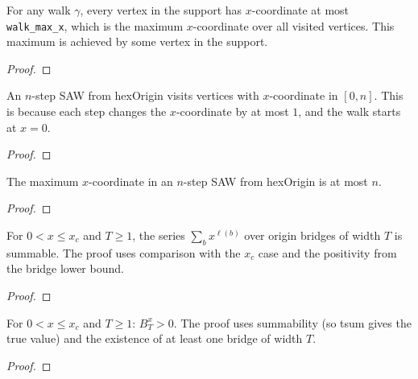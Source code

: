 \begin{theorem}\label{thm:walk_max_x}
\leanok
{}
  For any walk $\gamma$, every vertex in the support has $x$-coordinate
  at most \texttt{walk\_max\_x}, which is the maximum $x$-coordinate
  over all visited vertices. This maximum is achieved by some vertex
  in the support.
\end{theorem}
\begin{proof}
\leanok
\end{proof}

\begin{theorem}\label{thm:saw_x_bound}
\leanok
{}
  An $n$-step SAW from hexOrigin visits vertices with $x$-coordinate
  in $[0, n]$. This is because each step changes the $x$-coordinate
  by at most $1$, and the walk starts at $x = 0$.
\end{theorem}
\begin{proof}
\leanok
\end{proof}

\begin{theorem}\label{thm:saw_max_x_le}
\leanok
{}
  The maximum $x$-coordinate in an $n$-step SAW from hexOrigin is at most $n$.
\end{theorem}
\begin{proof}
\leanok
{}
\end{proof}

\begin{theorem}\label{thm:bridge_summable_le}
\leanok
{}
  For $0 < x \leq x_c$ and $T \geq 1$, the series
  $\sum_b x^{\ell(b)}$ over origin bridges of width $T$
  is summable. The proof uses comparison with the $x_c$ case
  and the positivity from the bridge lower bound.
\end{theorem}
\begin{proof}
\leanok
{}
\end{proof}

\begin{theorem}\label{thm:bridge_partition_pos}
\leanok
{}
  For $0 < x \leq x_c$ and $T \geq 1$: $B_T^x > 0$.
  The proof uses summability (so tsum gives the true value)
  and the existence of at least one bridge of width $T$.
\end{theorem}
\begin{proof}
\leanok
{}
\end{proof}

